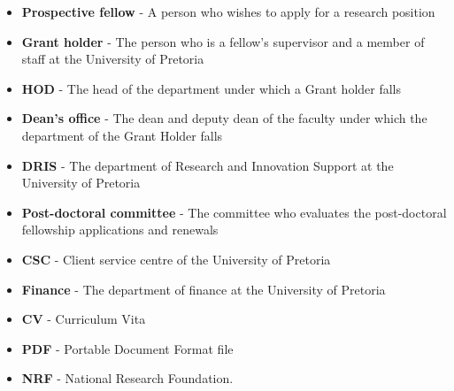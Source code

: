 \documentclass[12pt]{article}
\begin{document}
	\begin{itemize}
		\item \textbf{Prospective fellow} - A person who wishes to apply for a research position
		\item \textbf{Grant holder} - The person who is a fellow's supervisor and a member of staff at the University of Pretoria
		\item \textbf{HOD} - The head of the department under which a Grant holder falls
		\item \textbf{Dean's office} - The dean and deputy dean of the faculty under which the department of the Grant Holder falls
		\item \textbf{DRIS} - The department of Research and Innovation Support at the University of Pretoria
		\item \textbf{Post-doctoral committee} - The committee who evaluates the post-doctoral fellowship applications and renewals
		\item \textbf{CSC} - Client service centre of the University of Pretoria
		\item \textbf{Finance} - The department of finance at the University of Pretoria
		
		\item \textbf{CV} - Curriculum Vita
		\item \textbf{PDF} - Portable Document Format file
		\item \textbf{NRF} - National Research Foundation. 
	\end{itemize}	
		
	
	\vspace{0.5in}
		
\end{document}
